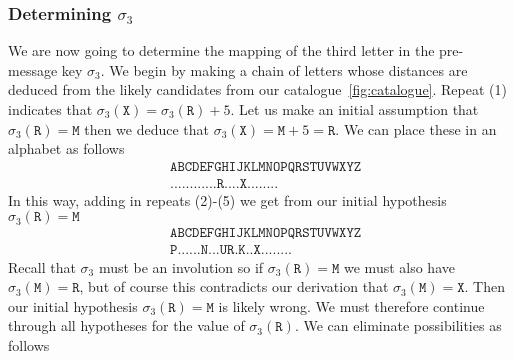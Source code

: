   \subsubsection{Determining $\sigma_3$}
  We are now going to determine the mapping of the third letter in
  the pre-message key $\sigma_3$. We begin by making a chain of
  letters whose distances are deduced from the likely candidates from
  our catalogue~\ref{fig:catalogue}. Repeat (1) indicates that
  $\sigma_3(\texttt{X}) = \sigma_3(\texttt{R}) + 5$. Let us make an
  initial assumption that $\sigma_3(\texttt{R}) = \texttt{M}$ then we
  deduce that $\sigma_3(\texttt{X}) = \texttt{M} + 5 = \texttt{R}$.
  We can place these in an alphabet as follows
  \begin{align*}
    & \texttt{ABCDEFGHIJKLMNOPQRSTUVWXYZ} \\
    & \texttt{............R....X........}
  \end{align*}
  In this way, adding in repeats (2)-(5) we get from our initial
  hypothesis $\sigma_3(\texttt{R}) = \texttt{M}$
  \begin{align*}
    & \texttt{ABCDEFGHIJKLMNOPQRSTUVWXYZ} \\
    & \texttt{P......N...UR.K..X........}
  \end{align*}
  Recall that $\sigma_3$ must be an involution so if
  $\sigma_3(\texttt{R}) = \texttt{M}$ we must also have
  $\sigma_3(\texttt{M}) = \texttt{R}$, but of course this contradicts
  our derivation that $\sigma_3(\texttt{M}) = \texttt{X}$. Then our
  initial hypothesis $\sigma_3(\texttt{R}) = \texttt{M}$ is likely
  wrong. We must therefore continue through all hypotheses for the
  value of $\sigma_3(\texttt{R})$. We can eliminate possibilities as follows
